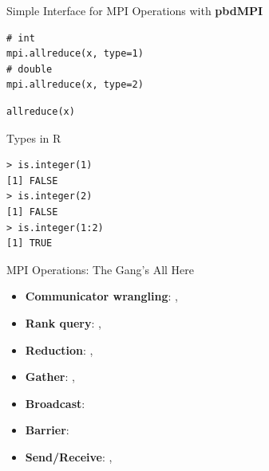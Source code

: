 \begin{frame}[fragile]
  \begin{block}{Simple Interface for MPI Operations with \textbf{pbdMPI}}\pause
\begin{minipage}[t]{.475\textwidth}
\begin{lstlisting}[title=Rmpi]
# int
mpi.allreduce(x, type=1)
# double
mpi.allreduce(x, type=2)
\end{lstlisting}
\end{minipage}
\hfill
\begin{minipage}[t]{.475\textwidth}
\begin{lstlisting}[title=pbdMPI]
allreduce(x)
\end{lstlisting}
\end{minipage}
\end{block}
%
\begin{block}{Types in R}
\vspace{-.2cm}
\begin{lstlisting}
> is.integer(1)
[1] FALSE
> is.integer(2)
[1] FALSE
> is.integer(1:2)
[1] TRUE
\end{lstlisting}
\end{block}
\end{frame}






\begin{frame}
  \begin{block}{MPI Operations: The Gang's All Here}\pause
    \begin{itemize}
      \item \textbf{Communicator wrangling}: {\color{blue},   
}\\[.4cm]
      \item \textbf{Rank query}: {\color{blue}, }\\[.4cm]
      \item \textbf{Reduction}: ,     
{\color{blue}}\\[.4cm]
      \item \textbf{Gather}: , {\color{blue}}\\[.4cm]
      \item \textbf{Broadcast}: \\[.4cm]
      \item \textbf{Barrier}: \\[.4cm]
      \item \textbf{Send/Receive}: , 
    \end{itemize}
  \end{block}
\end{frame}


